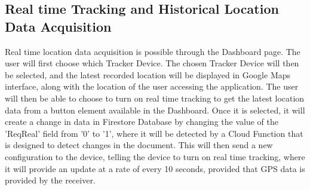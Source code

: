 \documentclass[conference]{IEEEtran}
\begin{document}
\subsection{Real time Tracking and Historical Location Data Acquisition}
Real time location data acquisition is possible through the Dashboard page. The user will first choose which Tracker Device. The chosen Tracker Device will then be selected, and the latest recorded location will be displayed in Google Maps interface, along with the location of the user 
accessing the application. The user will then be able to choose to turn on real time tracking to get the latest location data from a button element available in the Dashboard. Once it is selected, it will create a change in data in Firestore Database by changing the value of the 'ReqReal' field from '0' to '1', where it will be detected by a Cloud Function that is designed to detect changes in the document. 
This will then send a new configuration to the device, telling the device to turn on real time tracking, where it will provide an update at a rate of every 10 seconds, provided that GPS data is provided by the receiver.
\end{document}
